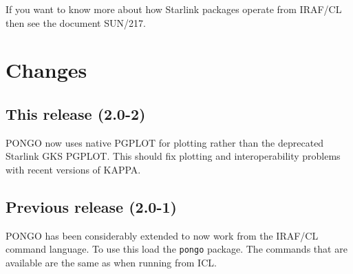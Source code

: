 \documentclass[twoside,11pt]{article}
\newcommand{\xref}[3]{#1}
\renewcommand{\_}{\texttt{\symbol{95}}}
\begin{document}
If you want to know more about how Starlink packages operate from
IRAF/CL then see the document \xref{SUN/217}{sun217}{}.

\section{Changes}
\subsection {This release (2.0-2)}

PONGO now uses native PGPLOT for plotting rather than the deprecated 
Starlink GKS PGPLOT. This should fix plotting and interoperability  
problems with recent versions of KAPPA.

\subsection{Previous release (2.0-1)}

PONGO has been considerably extended to now work from the IRAF/CL
command language. To use this load the \verb+pongo+ package. The 
commands that are available are the same as when running from ICL.
\end{document}
